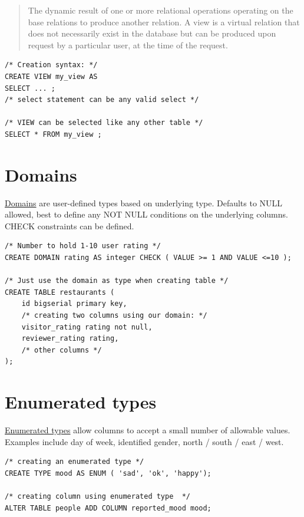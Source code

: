 \documentclass{pgnotes}
\begin{document}
\begin{quote}
The dynamic result of one or more relational operations operating on the
base relations to produce another relation. A view is a virtual relation
that does not necessarily exist in the database but can be produced upon
request by a particular user, at the time of the request.
\end{quote}

\begin{verbatim}
/* Creation syntax: */
CREATE VIEW my_view AS
SELECT ... ;
/* select statement can be any valid select */

/* VIEW can be selected like any other table */
SELECT * FROM my_view ; 
\end{verbatim}

\section{Domains}\label{sec:domains}

\href{https://www.postgresql.org/docs/13/domains.html}{Domains} are
user-defined types based on underlying type. Defaults to NULL allowed,
best to define any NOT NULL conditions on the underlying columns. CHECK
constraints can be defined.

\begin{verbatim}
/* Number to hold 1-10 user rating */
CREATE DOMAIN rating AS integer CHECK ( VALUE >= 1 AND VALUE <=10 );

/* Just use the domain as type when creating table */
CREATE TABLE restaurants (
    id bigserial primary key,
    /* creating two columns using our domain: */
    visitor_rating rating not null,
    reviewer_rating rating, 
    /* other columns */
);
\end{verbatim}

\section{Enumerated types}\label{sec:enumerated-types}

\href{https://www.postgresql.org/docs/13/datatype-enum.html}{Enumerated
types} allow columns to accept a small number of allowable values.
Examples include day of week, identified gender, north / south / east /
west.

\begin{verbatim}
/* creating an enumerated type */
CREATE TYPE mood AS ENUM ( 'sad', 'ok', 'happy');

/* creating column using enumerated type  */
ALTER TABLE people ADD COLUMN reported_mood mood;
\end{verbatim}
\end{document}
